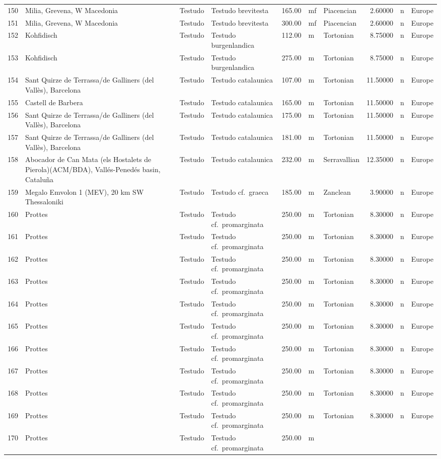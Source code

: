 \documentclass[]{article}
\begin{document}
\begin{longtable}[]{@{}llllrllrll@{}}
150 & Milia, Grevena, W Macedonia & Testudo & Testudo brevitesta &
165.00 & mf & Piacencian & 2.60000 & n & Europe\tabularnewline
151 & Milia, Grevena, W Macedonia & Testudo & Testudo brevitesta &
300.00 & mf & Piacencian & 2.60000 & n & Europe\tabularnewline
152 & Kohfidisch & Testudo & Testudo burgenlandica & 112.00 & m &
Tortonian & 8.75000 & n & Europe\tabularnewline
153 & Kohfidisch & Testudo & Testudo burgenlandica & 275.00 & m &
Tortonian & 8.75000 & n & Europe\tabularnewline
154 & Sant Quirze de Terrassa/de Galliners (del Vallès), Barcelona &
Testudo & Testudo catalaunica & 107.00 & m & Tortonian & 11.50000 & n &
Europe\tabularnewline
155 & Castell de Barbera & Testudo & Testudo catalaunica & 165.00 & m &
Tortonian & 11.50000 & n & Europe\tabularnewline
156 & Sant Quirze de Terrassa/de Galliners (del Vallès), Barcelona &
Testudo & Testudo catalaunica & 175.00 & m & Tortonian & 11.50000 & n &
Europe\tabularnewline
157 & Sant Quirze de Terrassa/de Galliners (del Vallès), Barcelona &
Testudo & Testudo catalaunica & 181.00 & m & Tortonian & 11.50000 & n &
Europe\tabularnewline
158 & Abocador de Can Mata (els Hostalets de Pierola)(ACM/BDA),
Vallés-Penedés basin, Cataluña & Testudo & Testudo catalaunica & 232.00
& m & Serravallian & 12.35000 & n & Europe\tabularnewline
159 & Megalo Emvolon 1 (MEV), 20 km SW Thessaloniki & Testudo & Testudo
cf.~graeca & 185.00 & m & Zanclean & 3.90000 & n & Europe\tabularnewline
160 & Prottes & Testudo & Testudo cf.~promarginata & 250.00 & m &
Tortonian & 8.30000 & n & Europe\tabularnewline
161 & Prottes & Testudo & Testudo cf.~promarginata & 250.00 & m &
Tortonian & 8.30000 & n & Europe\tabularnewline
162 & Prottes & Testudo & Testudo cf.~promarginata & 250.00 & m &
Tortonian & 8.30000 & n & Europe\tabularnewline
163 & Prottes & Testudo & Testudo cf.~promarginata & 250.00 & m &
Tortonian & 8.30000 & n & Europe\tabularnewline
164 & Prottes & Testudo & Testudo cf.~promarginata & 250.00 & m &
Tortonian & 8.30000 & n & Europe\tabularnewline
165 & Prottes & Testudo & Testudo cf.~promarginata & 250.00 & m &
Tortonian & 8.30000 & n & Europe\tabularnewline
166 & Prottes & Testudo & Testudo cf.~promarginata & 250.00 & m &
Tortonian & 8.30000 & n & Europe\tabularnewline
167 & Prottes & Testudo & Testudo cf.~promarginata & 250.00 & m &
Tortonian & 8.30000 & n & Europe\tabularnewline
168 & Prottes & Testudo & Testudo cf.~promarginata & 250.00 & m &
Tortonian & 8.30000 & n & Europe\tabularnewline
169 & Prottes & Testudo & Testudo cf.~promarginata & 250.00 & m &
Tortonian & 8.30000 & n & Europe\tabularnewline
170 & Prottes & Testudo & Testudo cf.~promarginata & 250.00 & m &

\end{longtable}
\end{document}
